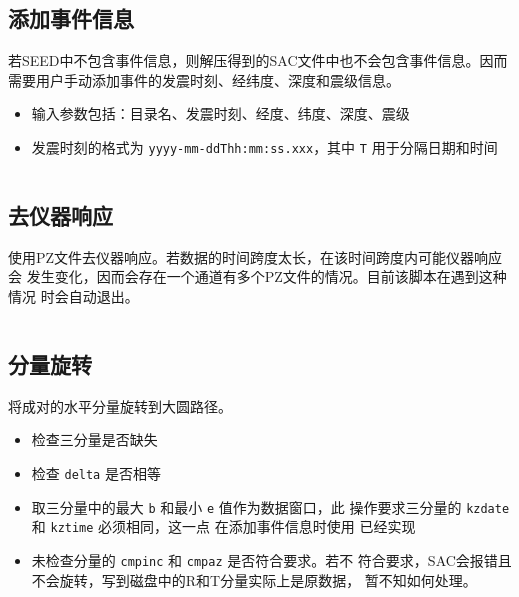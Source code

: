 \subsection{添加事件信息}
\label{subsec:event-info-python}
若SEED中不包含事件信息，则解压得到的SAC文件中也不会包含事件信息。因而
需要用户手动添加事件的发震时刻、经纬度、深度和震级信息。
\begin{itemize}
\item 输入参数包括：目录名、发震时刻、经度、纬度、深度、震级
\item 发震时刻的格式为 \texttt{yyyy-mm-ddThh:mm:ss.xxx}，其中 \texttt{T}
    用于分隔日期和时间
\end{itemize}
\inputminted{python}{./call-in-script/4.eventinfo.py}

\subsection{去仪器响应}
\label{subsec:transfer-python}
使用PZ文件去仪器响应。若数据的时间跨度太长，在该时间跨度内可能仪器响应会
发生变化，因而会存在一个通道有多个PZ文件的情况。目前该脚本在遇到这种情况
时会自动退出。
\inputminted{python}{./call-in-script/5.transfer.py}

\subsection{分量旋转}
\label{subsec:rotate-python}
将成对的水平分量旋转到大圆路径。
\begin{itemize}
\item 检查三分量是否缺失
\item 检查 \texttt{delta} 是否相等
\item 取三分量中的最大 \texttt{b} 和最小 \texttt{e} 值作为数据窗口，此
    操作要求三分量的 \texttt{kzdate} 和 \texttt{kztime} 必须相同，这一点
    在添加事件信息时使用  已经实现
\item 未检查分量的 \texttt{cmpinc} 和 \texttt{cmpaz} 是否符合要求。若不
    符合要求，SAC会报错且不会旋转，写到磁盘中的R和T分量实际上是原数据，
    暂不知如何处理。
\end{itemize}
\inputminted{python}{./call-in-script/6.rotate.py}

